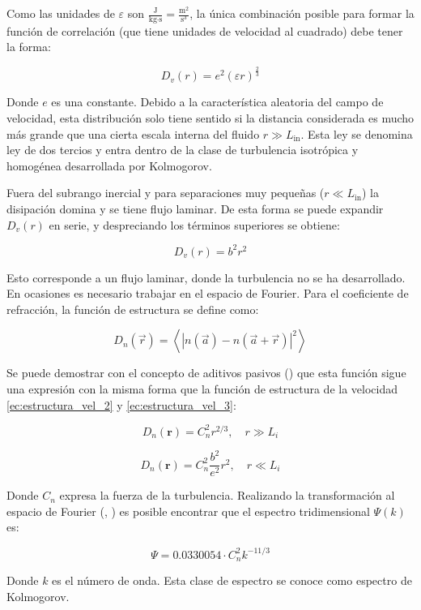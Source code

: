 Como las unidades de $\varepsilon$ son $\frac{\text{J}}{\text{kg}\cdot \text{s}} = \frac{\text{m}^2}{\text{s}^3}$, la única combinación posible para formar la función de correlación (que tiene unidades de velocidad al cuadrado) debe tener la forma: 

\begin{equation}\label{ec:estructura_vel_2}
    D_v(r) = e^2(\varepsilon r)^{\frac{2}{3}}
\end{equation}

Donde $e$ es una constante. Debido a la característica aleatoria del campo de velocidad, esta distribución solo tiene sentido si la distancia considerada es mucho más grande que una cierta escala interna del fluido $r\gg L_{\text{in}}$. Esta ley se denomina ley de dos tercios y entra dentro de la clase de turbulencia isotrópica y homogénea desarrollada por Kolmogorov.

Fuera del subrango inercial y para separaciones muy pequeñas ($r \ll L_{\text{in}}$) la disipación domina y se tiene flujo laminar. De esta forma se puede expandir $D_v(r)$ en serie, y despreciando los términos superiores se obtiene: 

\begin{equation}\label{ec:estructura_vel_3}
    D_v(r) = b^2r^2
\end{equation}

Esto corresponde a un flujo laminar, donde la turbulencia no se ha desarrollado. En ocasiones es necesario trabajar en el espacio de Fourier. Para el coeficiente de refracción, la función de estructura se define como:

\begin{equation}
    D_n(\vec{r}) = \left\langle \left|n(\vec{a}) - n(\vec{a} + \vec{r})\right|^2 \right\rangle
\end{equation}

Se puede demostrar con el concepto de aditivos pasivos (\cite{tatarski_wave_1967}) que esta función sigue una expresión con la misma forma que la función de estructura de la velocidad \ref{ec:estructura_vel_2} y \ref{ec:estructura_vel_3}:

\begin{equation}
    D_n(\mathbf{r}) = C_n^2 r^{2/3}, \quad r \gg L_i
\end{equation}

\begin{equation}
    D_n(\mathbf{r}) = C_n^2 \frac{b^2}{e^2} r^2, \quad r \ll L_i
\end{equation}

Donde $C_n$ expresa la fuerza de la turbulencia. Realizando la transformación al espacio de Fourier (\cite{tatarski_wave_1967}, \cite{sasiela_electromagnetic_2007}) es posible encontrar que el espectro tridimensional $\Psi(k)$ es:

\begin{equation}
    \Psi = 0.0330054 \cdot C_n^2k^{-11/3}
\end{equation}

Donde $k$ es el número de onda. Esta clase de espectro se conoce como espectro de Kolmogorov.